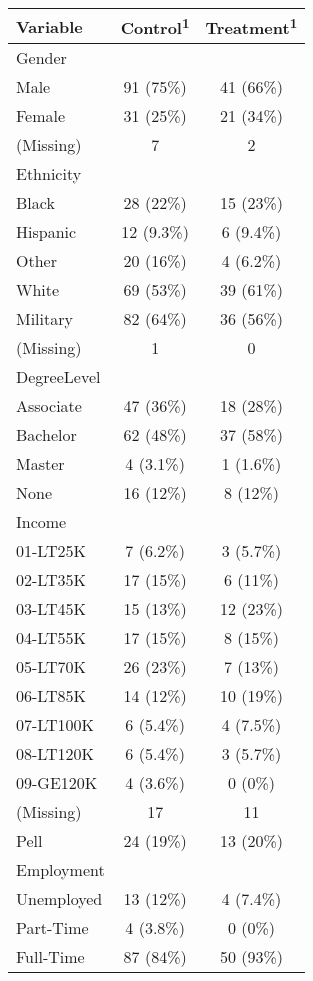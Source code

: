 \begin{appendix}
\captionsetup[table]{labelformat=empty,skip=1pt}
\setlength{\LTpost}{0mm}
\begin{longtable}{lcc}
\toprule
\textbf{Variable} & \textbf{Control}\textsuperscript{1} & \textbf{Treatment}\textsuperscript{1} \\ 
\midrule
Gender &  &  \\ 
Male & 91 (75\%) & 41 (66\%) \\ 
Female & 31 (25\%) & 21 (34\%) \\ 
(Missing) & 7 & 2 \\ 
Ethnicity &  &  \\ 
Black & 28 (22\%) & 15 (23\%) \\ 
Hispanic & 12 (9.3\%) & 6 (9.4\%) \\ 
Other & 20 (16\%) & 4 (6.2\%) \\ 
White & 69 (53\%) & 39 (61\%) \\ 
Military & 82 (64\%) & 36 (56\%) \\ 
(Missing) & 1 & 0 \\ 
DegreeLevel &  &  \\ 
Associate & 47 (36\%) & 18 (28\%) \\ 
Bachelor & 62 (48\%) & 37 (58\%) \\ 
Master & 4 (3.1\%) & 1 (1.6\%) \\ 
None & 16 (12\%) & 8 (12\%) \\ 
Income &  &  \\ 
01-LT25K & 7 (6.2\%) & 3 (5.7\%) \\ 
02-LT35K & 17 (15\%) & 6 (11\%) \\ 
03-LT45K & 15 (13\%) & 12 (23\%) \\ 
04-LT55K & 17 (15\%) & 8 (15\%) \\ 
05-LT70K & 26 (23\%) & 7 (13\%) \\ 
06-LT85K & 14 (12\%) & 10 (19\%) \\ 
07-LT100K & 6 (5.4\%) & 4 (7.5\%) \\ 
08-LT120K & 6 (5.4\%) & 3 (5.7\%) \\ 
09-GE120K & 4 (3.6\%) & 0 (0\%) \\ 
(Missing) & 17 & 11 \\ 
Pell & 24 (19\%) & 13 (20\%) \\ 
Employment &  &  \\ 
Unemployed & 13 (12\%) & 4 (7.4\%) \\ 
Part-Time & 4 (3.8\%) & 0 (0\%) \\ 
Full-Time & 87 (84\%) & 50 (93\%) \\ 

\end{longtable}
\end{appendix}
